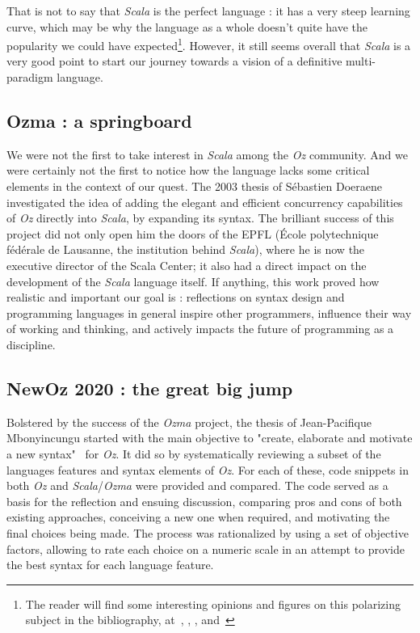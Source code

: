 That is not to say that \textit{Scala} is the perfect language :
it has a very steep learning curve, which may be why the language as a whole doesn't quite have the popularity we could have expected\footnote{The reader will find some interesting opinions and figures on this polarizing subject in the bibliography, at~\cite{scalaOpinion1}, \cite{scalaOpinion2}, \cite{jetbrainsfigures}, and~\cite{tiobeindex}}.
However, it still seems overall that \textit{Scala} is a very good point to start our journey towards a vision of a definitive multi-paradigm language.

\subsection{Ozma : a springboard}\label{subsec:ch1-ozma}
We were not the first to take interest in \textit{Scala} among the \textit{Oz} community.
And we were certainly not the first to notice how the language lacks some critical elements in the context of our quest.
The 2003 thesis of Sébastien Doeraene~\cite{Ozma} investigated the idea of adding the elegant and efficient concurrency capabilities of \textit{Oz} directly into \textit{Scala}, by expanding its syntax.
The brilliant success of this project did not only open him the doors of the EPFL (École polytechnique fédérale de Lausanne, the institution behind \textit{Scala}), where he is now the executive director of the Scala Center;
it also had a direct impact on the development of the \textit{Scala} language itself.
If anything, this work proved how realistic and important our goal is : reflections on syntax design and programming languages in general inspire other programmers, influence their way of working and thinking, and actively impacts the future of programming as a discipline.

\subsection{NewOz 2020 : the great big jump}\label{subsec:ch1-newoz2020}
Bolstered by the success of the \textit{Ozma} project, the thesis of Jean-Pacifique Mbonyincungu started with the main objective to "create, elaborate and motivate a new syntax"~\cite{jpthesis} for \textit{Oz}.
It did so by systematically reviewing a subset of the languages features and syntax elements of \textit{Oz}.
For each of these, code snippets in both \textit{Oz} and \textit{Scala}/\textit{Ozma} were provided and compared.
The code served as a basis for the reflection and ensuing discussion, comparing pros and cons of both existing approaches, conceiving a new one when required, and motivating the final choices being made.
The process was rationalized by using a set of objective factors, allowing to rate each choice on a numeric scale in an attempt to provide the best syntax for each language feature.\newline

